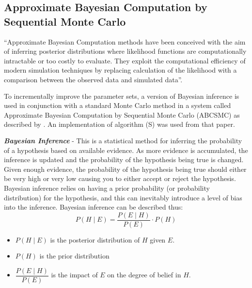 \subsection{Approximate Bayesian Computation by Sequential Monte Carlo}

``Approximate Bayesian Computation methods have been conceived with the aim of inferring posterior distributions where likelihood functions are computationally intractable or too costly to evaluate. They exploit the computational efficiency of modern simulation techniques by replacing calculation of the likelihood with a comparison between the observed data and simulated data''\cite{Toni2009}.

To incrementally improve the parameter sets, a version of Bayesian inference is used in conjunction with a standard Monte Carlo method in a system called Approximate Bayesian Computation by Sequential Monte Carlo (ABCSMC) as described by \citet{Toni2009}. An implementation of algorithm (S) was used from that paper.

\textbf{\textit{Bayesian Inference}} - This is a statistical method for inferring the probability of a hypothesis based on available evidence. As more evidence is accumulated, the inference is updated and the probability of the hypothesis being true is changed. Given enough evidence, the probability of the hypothesis being true should either be very high or very low causing you to either accept or reject the hypothesis. Bayesian inference relies on having a prior probability (or probability distribution) for the hypothesis, and this can inevitably introduce a level of bias into the inference.
Bayesian inference can be described thus:
\begin{equation}
P(H\mid E) = \dfrac{P(E\mid H)}{P(E)}\cdot P(H)
\label{eq:bayes}
\end{equation}
\begin{itemize}
	\item $P(H\mid E)$ is the posterior distribution of $H$ given $E$.
	\item $P(H)$ is the prior distribution
	\item $\dfrac{P(E\mid H)}{P(E)}$ is the impact of $E$ on the degree of belief in $H$.
\end{itemize}

